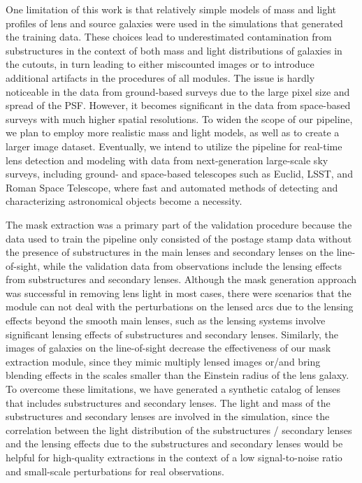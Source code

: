 \documentclass[12pt, twocolumn, apj]{openjournal}
\begin{document}
One limitation of this work is that relatively simple models of mass and light profiles of lens and source galaxies were used in the simulations that generated the training data. These choices lead to underestimated contamination from substructures in the context of both mass and light distributions of galaxies in the cutouts, in turn leading to either miscounted images or to introduce additional artifacts in the procedures of all modules. The issue is hardly noticeable in the data from ground-based surveys due to the large pixel size and spread of the PSF. However, it becomes significant in the data from space-based surveys with much higher spatial resolutions. To widen the scope of our pipeline, we plan to employ more realistic mass and light models, as well as to create a larger image dataset. Eventually, we intend to utilize the pipeline for real-time lens detection and modeling with data from next-generation large-scale sky surveys, including ground- and space-based telescopes such as Euclid, LSST, and Roman Space Telescope, where fast and automated methods of detecting and characterizing astronomical objects become a necessity.


The mask extraction was a primary part of the validation procedure because the data used to train the pipeline only consisted of the postage stamp data without the presence of substructures in the main lenses and secondary lenses on the line-of-sight, while the validation data from observations include the lensing effects from substructures and secondary lenses. Although the mask generation approach was successful in removing lens light in most cases, there were scenarios that the module can not deal with the perturbations on the lensed arcs due to the lensing effects beyond the smooth main lenses, such as the lensing systems involve significant lensing effects of substructures and secondary lenses. Similarly, the images of galaxies on the line-of-sight decrease the effectiveness of our mask extraction module, since they mimic multiply lensed images or/and bring blending effects in the scales smaller than the Einstein radius of the lens galaxy. To overcome these limitations, we have generated a synthetic catalog of lenses that includes substructures and secondary lenses. The light and mass of the substructures and secondary lenses are involved in the simulation, since the correlation between the light distribution of the substructures / secondary lenses and the lensing effects due to the substructures and secondary lenses would be helpful for high-quality extractions in the context of a low signal-to-noise ratio and small-scale perturbations for real observations. 
\newpage
\end{document}
